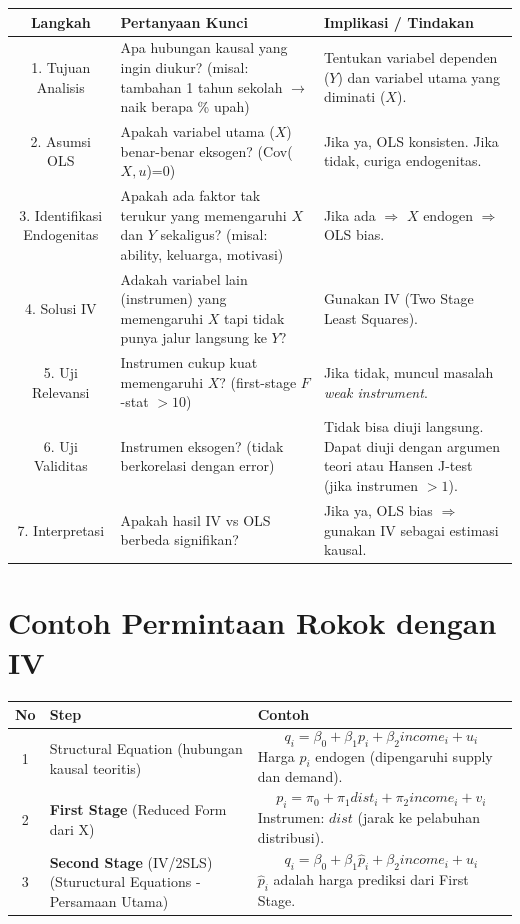 \documentclass[]{article}
\begin{document}
\begin{tabularx}{\textwidth}{|c|X|X|}
\hline
\textbf{Langkah} & \textbf{Pertanyaan Kunci} & \textbf{Implikasi / Tindakan} \\
\hline
1. Tujuan Analisis & 
Apa hubungan kausal yang ingin diukur? \newline 
(misal: tambahan 1 tahun sekolah $\rightarrow$ naik berapa \% upah) & 
Tentukan variabel dependen ($Y$) dan variabel utama yang diminati ($X$). \\
\hline
2. Asumsi OLS & 
Apakah variabel utama ($X$) benar-benar eksogen? \newline 
(Cov($X,u$)=0) & 
Jika ya, OLS konsisten. Jika tidak, curiga endogenitas. \\
\hline
3. Identifikasi Endogenitas & 
Apakah ada faktor tak terukur yang memengaruhi $X$ dan $Y$ sekaligus? \newline 
(misal: ability, keluarga, motivasi) & 
Jika ada $\Rightarrow$ $X$ endogen $\Rightarrow$ OLS bias. \\
\hline
4. Solusi IV & 
Adakah variabel lain (instrumen) yang memengaruhi $X$ tapi tidak punya jalur langsung ke $Y$? & 
Gunakan IV (Two Stage Least Squares). \\
\hline
5. Uji Relevansi & 
Instrumen cukup kuat memengaruhi $X$? \newline 
(first-stage $F$-stat $> 10$) & 
Jika tidak, muncul masalah \textit{weak instrument}. \\
\hline
6. Uji Validitas & 
Instrumen eksogen? (tidak berkorelasi dengan error) & 
Tidak bisa diuji langsung. \newline 
Dapat diuji dengan argumen teori atau Hansen J-test (jika instrumen $>1$). \\
\hline
7. Interpretasi & 
Apakah hasil IV vs OLS berbeda signifikan? & 
Jika ya, OLS bias $\Rightarrow$ gunakan IV sebagai estimasi kausal. \\
\hline
\end{tabularx}
\section*{Contoh Permintaan Rokok dengan IV}

\begin{tabularx}{\textwidth}{|c|X|X|}
\hline
\textbf{No} & \textbf{Step} & \textbf{Contoh} \\
\hline
1 & Structural Equation (hubungan kausal teoritis) & 
\[
q_i = \beta_0 + \beta_1 p_i + \beta_2 income_i + u_i
\]
Harga $p_i$ endogen (dipengaruhi supply dan demand). \\
\hline
2 & \textbf{First Stage} (Reduced Form dari X) & 
\[
p_i = \pi_0 + \pi_1 dist_i + \pi_2 income_i + v_i
\]
Instrumen: $dist$ (jarak ke pelabuhan distribusi). \\
\hline
3 & \textbf{Second Stage} (IV/2SLS) (Stuructural Equations - Persamaan Utama) & 
\[
q_i = \beta_0 + \beta_1 \hat{p}_i + \beta_2 income_i + u_i
\]
$\hat{p}_i$ adalah harga prediksi dari First Stage. \\
\hline
\end{tabularx}
\end{document}
